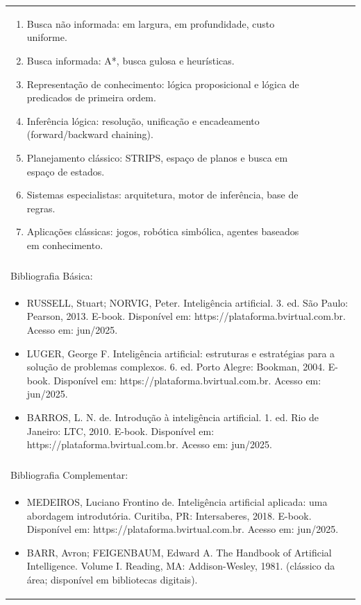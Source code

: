 \documentclass[11pt]{article}
\begin{document}
\begin{center}
\begin{longtable}{|p{4cm}|p{4cm}|p{4cm}|p{4cm}|}
{\begin{enumerate}
\item Busca não informada: em largura, em profundidade, custo uniforme.
\item Busca informada: A*, busca gulosa e heurísticas.
\item Representação de conhecimento: lógica proposicional e lógica de predicados de primeira ordem.
\item Inferência lógica: resolução, unificação e encadeamento (forward/backward chaining).
\item Planejamento clássico: STRIPS, espaço de planos e busca em espaço de estados.
\item Sistemas especialistas: arquitetura, motor de inferência, base de regras.
\item Aplicações clássicas: jogos, robótica simbólica, agentes baseados em conhecimento.\end{enumerate}}\\
\multicolumn{4}{|p{16cm}|}{}\\
\hline
\multicolumn{4}{|p{16cm}|}{Bibliografia Básica:}\\
\multicolumn{4}{|p{16cm}|}{%
\begin{itemize}\item RUSSELL, Stuart; NORVIG, Peter. Inteligência artificial. 3. ed. São Paulo: Pearson, 2013. E-book. Disponível em: https://plataforma.bvirtual.com.br. Acesso em: jun/2025.
\item LUGER, George F. Inteligência artificial: estruturas e estratégias para a solução de problemas complexos. 6. ed. Porto Alegre: Bookman, 2004. E-book. Disponível em: https://plataforma.bvirtual.com.br. Acesso em: jun/2025.
\item BARROS, L. N. de. Introdução à inteligência artificial. 1. ed. Rio de Janeiro: LTC, 2010. E-book. Disponível em: https://plataforma.bvirtual.com.br. Acesso em: jun/2025.\end{itemize}}\\
\multicolumn{4}{|p{16cm}|}{}\\
\hline
\multicolumn{4}{|p{16cm}|}{Bibliografia Complementar:}\\
\multicolumn{4}{|p{16cm}|}{%
\begin{itemize}\item MEDEIROS, Luciano Frontino de. Inteligência artificial aplicada: uma abordagem introdutória. Curitiba, PR: Intersaberes, 2018. E-book. Disponível em: https://plataforma.bvirtual.com.br. Acesso em: jun/2025.
\item BARR, Avron; FEIGENBAUM, Edward A. The Handbook of Artificial Intelligence. Volume I. Reading, MA: Addison-Wesley, 1981. (clássico da área; disponível em bibliotecas digitais).

\end{itemize}}
\end{longtable}
\end{center}
\end{document}
